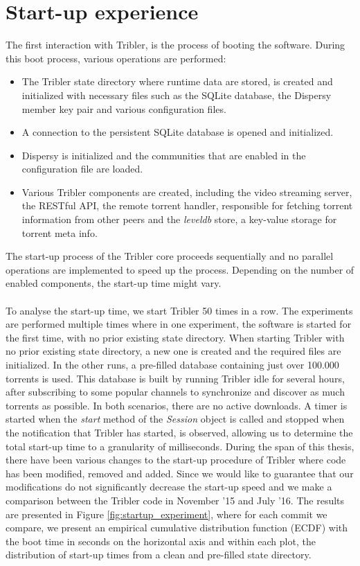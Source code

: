 \section{Start-up experience}
The first interaction with Tribler, is the process of booting the software. During this boot process, various operations are performed:
\begin{itemize}
	\item The Tribler state directory where runtime data are stored, is created and initialized with necessary files such as the SQLite database, the Dispersy member key pair and various configuration files.
	\item A connection to the persistent SQLite database is opened and initialized.
	\item Dispersy is initialized and the communities that are enabled in the configuration file are loaded.
	\item Various Tribler components are created, including the video streaming server, the RESTful API, the remote torrent handler, responsible for fetching torrent information from other peers and the \emph{leveldb} store, a key-value storage for torrent meta info.
\end{itemize}
The start-up process of the Tribler core proceeds sequentially and no parallel operations are implemented to speed up the process. Depending on the number of enabled components, the start-up time might vary.\\\\
To analyse the start-up time, we start Tribler 50 times in a row. The experiments are performed multiple times where in one experiment, the software is started for the first time, with no prior existing state directory. When starting Tribler with no prior existing state directory, a new one is created and the required files are initialized. In the other runs, a pre-filled database containing just over 100.000 torrents is used. This database is built by running Tribler idle for several hours, after subscribing to some popular channels to synchronize and discover as much torrents as possible. In both scenarios, there are no active downloads. A timer is started when the \emph{start} method of the \emph{Session} object is called and stopped when the notification that Tribler has started, is observed, allowing us to determine the total start-up time to a granularity of milliseconds. During the span of this thesis, there have been various changes to the start-up procedure of Tribler where code has been modified, removed and added. Since we would like to guarantee that our modifications do not significantly decrease the start-up speed and we make a comparison between the Tribler code in November '15 and July '16. The results are presented in Figure \ref{fig:startup_experiment}, where for each commit we compare, we present an empirical cumulative distribution function (ECDF) with the boot time in seconds on the horizontal axis and within each plot, the distribution of start-up times from a clean and pre-filled state directory.\\

